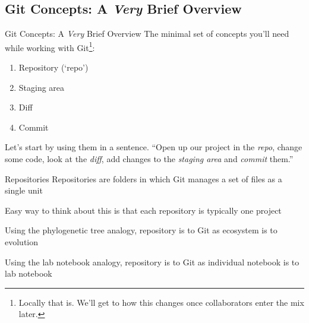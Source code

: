 \documentclass[pdf]{beamer} %
\begin{document}
\subsection{Git Concepts: A \emph{Very} Brief Overview}
\begin{frame}[t]{Git Concepts: A \emph{Very} Brief Overview}
    The minimal set of concepts you'll need while working with Git\footnote{Locally that is. We'll get to how this changes once collaborators enter the mix later.}:
    \begin{enumerate}
        \item Repository (`repo')
        \item Staging area
        \item Diff
        \item Commit
    \end{enumerate}
    Let's start by using them in a sentence.
    ``Open up our project in the \emph{repo}, change some code, look at the \emph{diff}, add changes to the \emph{staging area} and \emph{commit} them.''

\end{frame}

\begin{frame}[t]{Repositories}
    Repositories are folders in which Git manages a set of files as a single unit

    \vspace{1cm}
    Easy way to think about this is that each repository is typically one project

    \vspace{1cm}
    Using the phylogenetic tree analogy, repository is to Git as ecosystem is to evolution

    \vspace{1cm}
    Using the lab notebook analogy, repository is to Git as individual notebook is to lab notebook
\end{frame}
\end{document}
